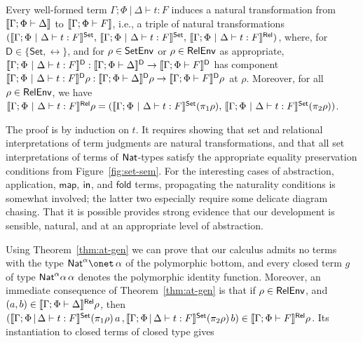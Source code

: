 \documentclass[runningheads]{llncs}
\newcommand{\set}{\mathsf{Set}}
\newcommand{\map}{\mathsf{map}}
\begin{document}
\begin{theorem}\label{thm:at-gen}
Every well-formed term $\Gamma;\Phi~|~\Delta \vdash t : F$ induces a
natural transformation from $\llbracket{\Gamma; \Phi \vdash \Delta}\rrbracket$ to
$\llbracket{\Gamma; \Phi \vdash F}\rrbracket$, i.e., a triple of natural
transformations $(\setsem{\Gamma;\Phi~|~\Delta \vdash t : F},\,
\setsem{\Gamma;\Phi~|~\Delta \vdash t : F},\,
\relsem{\Gamma;\Phi~|~\Delta \vdash t : F})$, where, for $\mathsf D
\in \{\set,\rel\}$, and for $\rho \in \mathsf{SetEnv}$ or $\rho \in \mathsf{RelEnv}$ as
appropriate, $\llbracket{\Gamma;\Phi~|~\Delta \vdash t : F}\rrbracket^{\mathsf D} :
\llbracket{\Gamma; \Phi \vdash \Delta}\rrbracket^{\mathsf D} \to \llbracket{\Gamma; \Phi
  \vdash F}\rrbracket^{\mathsf D}$ has component $\llbracket{\Gamma;\Phi~|~\Delta
  \vdash t : F}\rrbracket^{\mathsf D}\rho : \llbracket{\Gamma; \Phi \vdash
  \Delta}\rrbracket^{\mathsf D}\rho \to \llbracket{\Gamma; \Phi \vdash F}\rrbracket^{\mathsf
  D}\rho$ at $\rho$. Moreover, for all $\rho \in \mathsf{RelEnv}$, we have
$\relsem{\Gamma;\Phi~|~\Delta \vdash t : F}\rho =
(\setsem{\Gamma;\Phi~|~\Delta \vdash t : F}(\pi_1 \rho),\,
\setsem{\Gamma;\Phi~|~\Delta \vdash t : F}(\pi_2 \rho))$.

\vspace*{-0.05in}

\end{theorem}
The proof is by induction on $t$. It requires showing that set and
relational interpretations of term judgments are natural
transformations, and that all set interpretations of terms of
$\mathsf{Nat}$-types satisfy the appropriate equality preservation conditions
from Figure~\ref{fig:set-sem}.  For the interesting cases of
abstraction, application, $\map$, $\mathsf{in}$, and $\mathsf{fold}$ terms,
propagating the naturality conditions is somewhat involved; the latter
two especially require some delicate diagram chasing. That it is
possible provides strong evidence that our development is sensible,
natural, and at an appropriate level of abstraction.

Using Theorem~\ref{thm:at-gen} we can prove that our calculus admits
no terms with the type $\Nat^\alpha \onet \,\alpha$ of the polymorphic
bottom, and every closed term $g$ of type $\mathsf{Nat}^\alpha\alpha\,\alpha$
denotes the polymorphic identity function. Moreover, an immediate
consequence of Theorem~\ref{thm:at-gen} is that if $\rho \in \mathsf{RelEnv}$,
and \,$(a, b) \in \llbracket{\Gamma; \Phi \vdash \Delta}\rrbracket^{\mathsf{Rel}} \rho$, then
$(\setsem{\Gamma; \Phi \,|\, \Delta \vdash t : F} (\pi_1 \rho) \,a \,
, \setsem{\Gamma; \Phi \,|\, \Delta \vdash t : F } (\pi_2 \rho) \,b)
\in \relsem{\Gamma; \Phi \vdash F} \rho$.  Its instantiation to closed
terms of closed type gives
\end{document}
